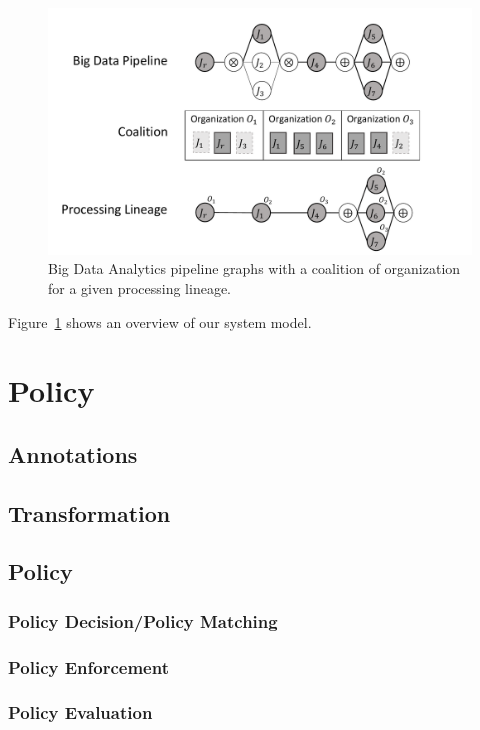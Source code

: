 
\begin{figure}[!t]
  \includegraphics[width=0.98\columnwidth]{generaleFig1.pdf}
  \caption{Big Data Analytics pipeline graphs with a coalition of organization for a given processing lineage.}\label{fig:BDpipeline}
\end{figure}

Figure~\ref{fig:BDpipeline} shows an overview of our system model.



\section{Policy}

\subsection{Annotations}
\subsection{Transformation}
\subsection{Policy}

\subsubsection{Policy Decision/Policy Matching}
\subsubsection{Policy Enforcement}
\subsubsection{Policy Evaluation}